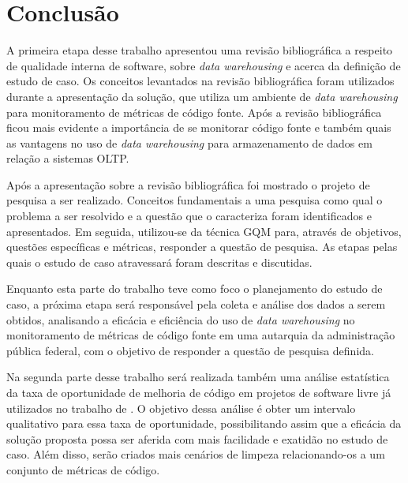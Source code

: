 \chapter{Conclusão}

A primeira etapa desse trabalho apresentou uma revisão bibliográfica a respeito de qualidade interna de software, sobre \textit{data warehousing} e acerca da definição de estudo de caso. Os conceitos levantados na revisão bibliográfica foram utilizados durante a apresentação da solução, que utiliza um ambiente de \textit{data warehousing} para monitoramento de métricas de código fonte. Após a revisão bibliográfica ficou mais evidente a importância de se monitorar código fonte e também quais as vantagens no uso de \textit{data warehousing} para armazenamento de dados em relação a sistemas OLTP. 

Após a apresentação sobre a revisão bibliográfica foi mostrado o projeto de pesquisa a ser realizado. Conceitos fundamentais a uma pesquisa como qual o problema a ser resolvido e a questão que o caracteriza foram identificados e apresentados. Em seguida, utilizou-se da  técnica GQM para, através de objetivos, questões específicas e métricas, responder a questão de pesquisa. As etapas pelas quais o estudo de caso atravessará foram descritas e discutidas.

Enquanto esta parte do trabalho teve como foco o planejamento do estudo de caso, a próxima etapa será responsável pela coleta e análise dos dados a serem obtidos, analisando a eficácia e eficiência do uso de \textit{data warehousing} no monitoramento de métricas de código fonte em uma autarquia da administração pública federal, com o objetivo de responder a questão de pesquisa definida.

Na segunda parte desse trabalho será realizada também uma análise estatística da taxa de oportunidade de melhoria de código em projetos de software livre já utilizados no trabalho de \cite{Meirelles2013}. O objetivo dessa análise é obter um intervalo qualitativo para essa taxa de oportunidade, possibilitando assim que a eficácia da solução proposta possa ser aferida com mais facilidade e exatidão no estudo de caso. Além disso, serão criados mais cenários de limpeza relacionando-os a um conjunto de métricas de código.